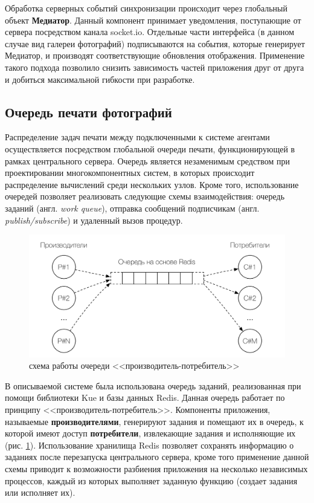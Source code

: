 \documentclass[a4paper,14pt,href]{article}
\begin{document}
Обработка серверных событий синхронизации происходит через глобальный объект \textbf{Медиатор}\cite{MediatorPattern}.
Данный компонент принимает уведомления, поступающие от сервера посредством канала socket.io. Отдельные части интерфейса
(в данном случае вид галереи фотографий) подписываются на события, которые генерирует Медиатор, и производят
соответствующие обновления отображения. Применение такого подхода позволило снизить зависимость частей приложения друг
от друга и добиться максимальной гибкости при разработке.

\subsection{Очередь печати фотографий}
Распределение задач печати между подключенными к системе агентами осуществляется посредством глобальной очереди печати,
функционирующей в рамках центрального сервера. Очередь является незаменимым средством при проектировании многокомпонентных
систем, в которых происходит распределение вычислений среди нескольких узлов. Кроме того, использование очередей позволяет
реализовать следующие схемы взаимодействия: очередь заданий (англ. \textit{work queue}), отправка сообщений
подписчикам\cite{RabbitMQ} (англ. \textit{publish/subscribe}) и удаленный вызов про\-це\-дур\cite{DistributiveSystems}.


\begin{figure}[htbp]
\begin{center}
  \includegraphics[scale=0.8]{producer-consumer.pdf}
    \caption{схема работы очереди <<производитель-потребитель>>}
    \label{fig:ProducerConsumer}
\end{center}
\end{figure}


В описываемой системе была использована очередь заданий, реализованная при помощи библиотеки Kue\cite{Kue} и базы данных
Redis. Данная очередь работает по принципу <<производитель-потребитель>>. Компоненты приложения, называемые
\textbf{производителями}, генерируют задания и помещают их в очередь, к которой имеют доступ \textbf{потребители},
извлекающие задания и исполняющие их (рис. \ref{fig:ProducerConsumer}). Использование хранилища Redis позволяет
сохранять информацию о заданиях после перезапуска центрального сервера, кроме того применение данной схемы приводит к
возможности разбиения приложения на несколько независимых процессов, каждый из которых выполняет заданную функцию
(создает задания или исполняет их).
\end{document}
